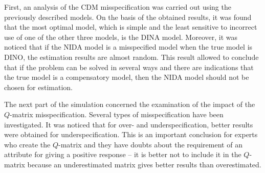 \documentclass[english]{pwr_wmat_praca_dyplomowa}
\theoremstyle{plain}
\numberwithin{theorem}{chapter}
\theoremstyle{definition}
\numberwithin{theorem}{chapter}
\begin{document}
	First, an analysis of the CDM misspecification was carried out using the previously described models. On the basis of the obtained results, it was found that the most optimal model, which is simple and the least sensitive to incorrect use of one of the other three models, is the DINA model. Moreover, it was noticed that if the NIDA model is a misspecified model when the true model is DINO, the estimation results are almost random. This result allowed to conclude that if the problem can be solved in several ways and there are indications that the true model is a compensatory model, then the NIDA model should not be chosen for estimation.
	
	The next part of the simulation concerned the examination of the impact of the $Q$-matrix misspecification. Several types of misspecification have been investigated. It was noticed that for over- and underspecification, better results were obtained for underspecification. This is an important conclusion for experts who create the $Q$-matrix and they have doubts about the requirement of an attribute for giving a positive response -- it is better not to include it in the $Q$-matrix because an underestimated matrix gives better results than overestimated.
	
\end{document}
